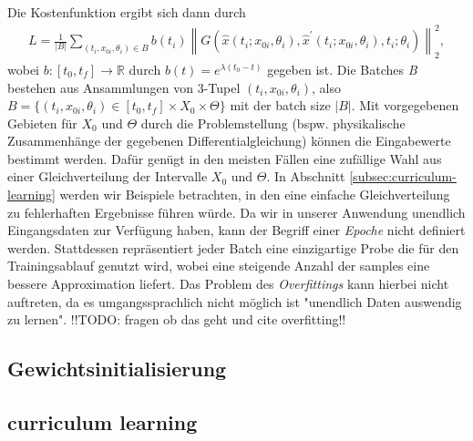 Die Kostenfunktion ergibt sich dann durch
\begin{align}
    \label{cost-func}
    L = \frac{1}{|B|} \sum_{(t_i,x_{0i},\theta_i) \in B} b(t_i)
    \left\lVert G(\hat{x}(t_i;x_{0i},\theta_i), \hat{x}^{\prime}(t_i;x_{0i},\theta_i),t_i;\theta_i) \right\rVert_2^2,
\end{align}
wobei $b:[t_0,t_f] \rightarrow \mathbb{R}$ durch $b(t) = e^{\lambda (t_0 - t)}$ gegeben ist. Die Batches \textit{B}
bestehen aus Ansammlungen von 3-Tupel $(t_i,x_{0i},\theta_i)$, also
$B=\{(t_i,x_{0i},\theta_i) \in [t_0,t_f] \times X_0 \times \Theta\}$ mit der batch size $|B|$. Mit vorgegebenen Gebieten
für $X_0$ und $\Theta$ durch die Problemstellung (bspw. physikalische Zusammenhänge der gegebenen Differentialgleichung)
können die Eingabewerte bestimmt werden. Dafür genügt in den meisten Fällen eine zufällige Wahl aus einer
Gleichverteilung der Intervalle $X_0$ und $\Theta$. In Abschnitt \eqref{subsec:curriculum-learning} werden wir Beispiele
betrachten, in den eine einfache Gleichverteilung zu fehlerhaften Ergebnisse führen würde. Da wir in unserer Anwendung
unendlich Eingangsdaten zur Verfügung haben, kann der Begriff einer \textit{Epoche} nicht definiert werden.
Stattdessen repräsentiert jeder Batch eine einzigartige Probe die für den Trainingsablauf genutzt wird, wobei eine
steigende Anzahl der samples eine bessere Approximation liefert. Das Problem des \textit{Overfittings} kann hierbei
nicht auftreten, da es umgangssprachlich nicht möglich ist "unendlich Daten auswendig zu lernen". !!TODO: fragen ob das
geht und cite overfitting!!\\


\subsection{Gewichtsinitialisierung}
\label{subsec:gewichtsinitialisierung}


\subsection{curriculum learning}
\label{subsec:curriculum-learning}